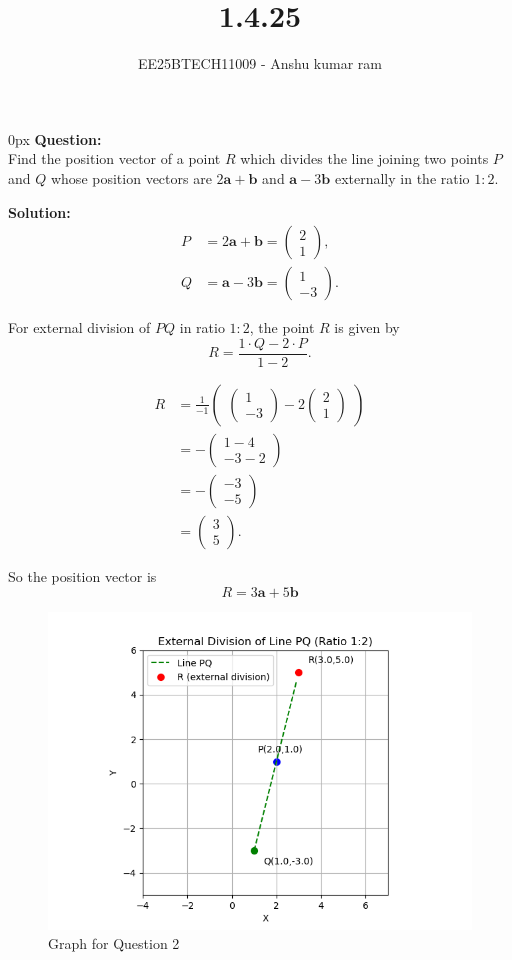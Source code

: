 \documentclass[journal]{IEEEtran}
\newcommand{\solution}{\textbf{Solution: }}
\newcommand{\brak}[1]{\begin{pmatrix}#1\end{pmatrix}}
\begin{document}

\vspace{3cm}

\title{1.4.25}
\author{EE25BTECH11009 - Anshu kumar ram}
{\let\newpage\relax\maketitle}

\renewcommand{\thefigure}{\theenumi}
\renewcommand{\thetable}{\theenumi}
\setlength{\intextsep}{10pt}

\parindent 0px
\textbf{Question:} \\
Find the position vector of a point \( R \) which divides the line joining two points \( P \) and \( Q \) whose position vectors are \(2\mathbf a + \mathbf b\) and \(\mathbf a - 3\mathbf b\) externally in the ratio \(1:2\).

\solution \\

\begin{align}
P &= 2\mathbf a + \mathbf b
   = \brak{2\\1}, \\
Q &= \mathbf a - 3\mathbf b
   = \brak{1\\-3}.
\end{align}

For external division of \(PQ\) in ratio \(1:2\),  
the point \(R\) is given by
\[
R = \frac{1 \cdot Q - 2 \cdot P}{1-2}.
\]

\begin{align}
R &= \frac{1}{-1}\brak{\brak{1\\-3} - 2\brak{2\\1}} \\[6pt]
  &= -\brak{1-4\\-3-2} \\[6pt]
  &= -\brak{-3\\-5} \\[6pt]
  &= \brak{3\\5}.
\end{align}

So the position vector is
\[
\boxed{\,R = 3\mathbf a + 5\mathbf b\,}
\]

\begin{figure}[ht!]
    \centering
    \includegraphics[width=\columnwidth, keepaspectratio]{figs/section_graph.png}
    \captionsetup{justification=centering}
    \caption{Graph for Question 2}
    \label{fig:section_graph}
\end{figure}
\end{document}
